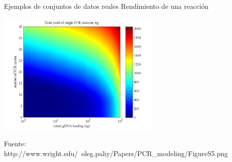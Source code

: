 \documentclass[aspectratio=169]{beamer}
\begin{document}
\begin{frame}{Ejemplos de conjuntos de datos reales}
{\scriptsize Rendimiento de una reacción}
\vspace{-1cm}\begin{center}
    \includegraphics[height=6cm]{yield_heatmap}
  \end{center}\vspace{-0.5cm}

   {\tiny Fuente: http://www.wright.edu/~oleg.paliy/Papers/PCR\_modeling/FigureS5.png}


 \end{frame}
\end{document}
